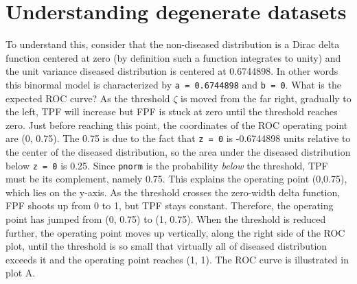 \documentclass[
]{book}
\begin{document}
\hypertarget{understanding-degenerate-datasets}{%
\section{Understanding degenerate datasets}\label{understanding-degenerate-datasets}}

To understand this, consider that the non-diseased distribution is a Dirac delta function centered at zero (by definition such a function integrates to unity) and the unit variance diseased distribution is centered at 0.6744898. In other words this binormal model is characterized by \texttt{a\ =\ 0.6744898} and \texttt{b\ =\ 0}. What is the expected ROC curve? As the threshold \(\zeta\) is moved from the far right, gradually to the left, TPF will increase but FPF is stuck at zero until the threshold reaches zero. Just before reaching this point, the coordinates of the ROC operating point are (0, 0.75). The 0.75 is due to the fact that \texttt{z\ =\ 0} is -0.6744898 units relative to the center of the diseased distribution, so the area under the diseased distribution below \texttt{z\ =\ 0} is 0.25. Since \texttt{pnorm} is the probability \emph{below} the threshold, TPF must be its complement, namely 0.75. This explains the operating point (0,0.75), which lies on the y-axis. As the threshold crosses the zero-width delta function, FPF shoots up from 0 to 1, but TPF stays constant. Therefore, the operating point has jumped from (0, 0.75) to (1, 0.75). When the threshold is reduced further, the operating point moves up vertically, along the right side of the ROC plot, until the threshold is so small that virtually all of diseased distribution exceeds it and the operating point reaches (1, 1). The ROC curve is illustrated in plot A.
\end{document}

